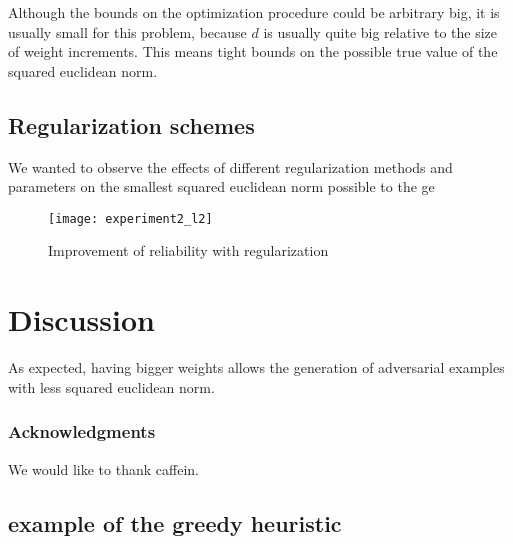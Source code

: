 \documentclass{article} %
\begin{document}
Although the bounds on the optimization procedure could be arbitrary big, it
is usually small for this problem, because $d$ is usually quite big relative
to the size of weight increments. This means tight bounds on the possible
true value of the squared euclidean norm.



\subsection{Regularization schemes}

We wanted to observe the effects of different regularization methods and
parameters on the smallest squared euclidean norm possible to the ge

\begin{figure}[h!]
\texttt{[image: experiment2\_l2]}
\caption{\small Improvement of reliability with regularization}
\end{figure}

\subsection{}

\section{Discussion}

As expected, having bigger weights allows the generation of adversarial examples with less
squared euclidean norm.


\subsubsection*{Acknowledgments}
We would like to thank caffein.








\newpage




\subsection{example of the greedy heuristic}
\end{document}

